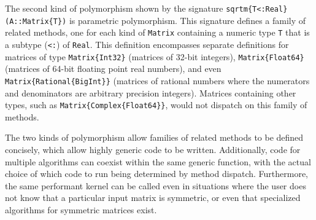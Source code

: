 The second kind of polymorphism shown by the signature
\lstinline|sqrtm{T<:Real}(A::Matrix{T})| is parametric polymorphism. This
signature defines a family of related methods, one for each kind of
\lstinline|Matrix| containing a numeric type \lstinline|T| that is a subtype
(\lstinline|<:|) of \lstinline|Real|. This definition encompasses separate
definitions for matrices of type \lstinline|Matrix{Int32}| (matrices of 32-bit
integers), \lstinline|Matrix{Float64}| (matrices of 64-bit floating point real
numbers), and even \lstinline|Matrix{Rational{BigInt}}| (matrices of rational
numbers where the numerators and denominators are arbitrary precision
integers). Matrices containing other types, such as
\lstinline|Matrix{Complex{Float64}}|, would not dispatch on this family of methods.

The two kinds of polymorphism allow families of related methods to be defined
concisely, which allow highly generic code to be written. Additionally, code for
multiple algorithms can coexist within the same generic function, with the actual
choice of which code to run being determined by method dispatch. Furthermore,
the same performant kernel can be called even in situations where the user does
not know that a particular input matrix is symmetric, or even that specialized
algorithms for symmetric matrices exist.

